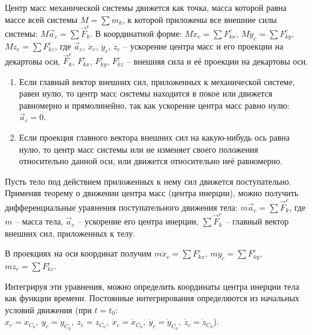 
Центр масс механической системы движется как точка, масса которой равна массе
всей системы \( M = \sum m_k \), к которой приложены все внешние силы системы:
\( M\vec{a}_c = \sum \vec{F}^e_k \). В координатной форме:
\( M\ddot{x}_c = \sum F^e_{kx} \), \( M\ddot{y}_c = \sum F^e_{ky} \),
\( M\ddot{z}_c = \sum F^e_{kz} \), где \( \vec{a}_c \), \( \ddot{x}_c \),
\( \ddot{y}_c \), \( \ddot{z}_c \) -- ускорение центра масс и его проекции на
декартовы оси, \( \vec{F}^e_k \), \( F^e_{kx} \), \( F^e_{ky} \), \( F^e_{kz} \)
-- внешняя сила и её проекции на декартовы оси.

\begin{enumerate}
    \item Если главный вектор внешних сил, приложенных к механической системе,
    равен нулю, то центр масс системы находится в покое или движется равномерно
    и прямолинейно, так как ускорение центра масс равно нулю:
    \( \vec{a}_c = 0 \).
    
    \item Если проекция главного вектора внешних сил на какую-нибудь ось равна
    нулю, то центр масс системы или не изменяет своего положения относительно
    данной оси, или движется относительно неё равномерно.
\end{enumerate}


Пусть тело под действием приложенных к нему сил движется поступательно. Применяя
теорему о движении центра масс (центра инерции), можно получить дифференциальные
уравнения поступательного движения тела: \( m\vec{a}_c = \sum \vec{F}^e_k \), где
\( m \) -- масса тела, \( \vec{a}_c \) -- ускорение его центра инерции,
\( \sum \vec{F}^e_k \) -- главный вектор внешних сил, приложенных к телу.

В проекциях на оси координат получим \( m\ddot{x}_c = \sum F^e_{kx} \),
\( m\ddot{y}_c = \sum F^e_{ky} \), \( m\ddot{z}_c = \sum F^e_{kz} \).

Интегрируя эти уравнения, можно определить координаты центра инерции тела как
функции времени. Постоянные интегрирования определяются из начальных условий
движения (при \( t = t_0 \): \( x_c = x_{C_0},\ y_c = y_{C_0},\ z_c = z_{C_0},\ 
\dot{x}_c = \dot{x}_{C_0},\ \dot{y}_c = \dot{y}_{C_0},\ 
\dot{z}_c = \dot{z}_{C_0} \)).

